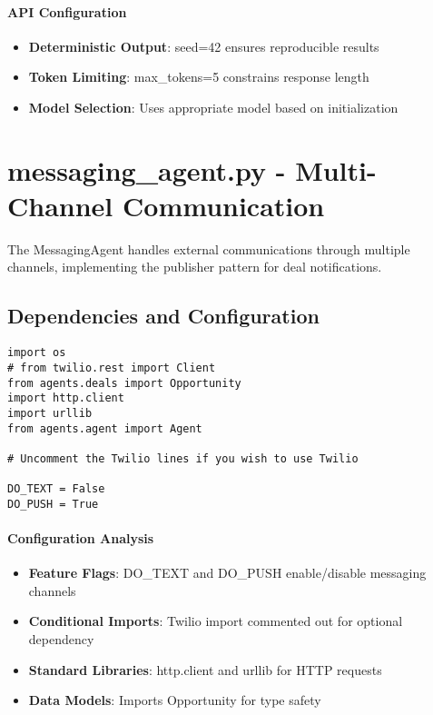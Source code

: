 \paragraph{API Configuration}
\begin{itemize}
\item \textbf{Deterministic Output}: seed=42 ensures reproducible results
\item \textbf{Token Limiting}: max\_tokens=5 constrains response length
\item \textbf{Model Selection}: Uses appropriate model based on initialization
\end{itemize}

\section{messaging\_agent.py - Multi-Channel Communication}

The MessagingAgent handles external communications through multiple channels, implementing the publisher pattern for deal notifications.

\subsection{Dependencies and Configuration}

\begin{lstlisting}[caption=messaging\_agent.py - Configuration]
import os
# from twilio.rest import Client
from agents.deals import Opportunity
import http.client
import urllib
from agents.agent import Agent

# Uncomment the Twilio lines if you wish to use Twilio

DO_TEXT = False
DO_PUSH = True
\end{lstlisting}

\paragraph{Configuration Analysis}
\begin{itemize}
\item \textbf{Feature Flags}: DO\_TEXT and DO\_PUSH enable/disable messaging channels
\item \textbf{Conditional Imports}: Twilio import commented out for optional dependency
\item \textbf{Standard Libraries}: http.client and urllib for HTTP requests
\item \textbf{Data Models}: Imports Opportunity for type safety
\end{itemize}

